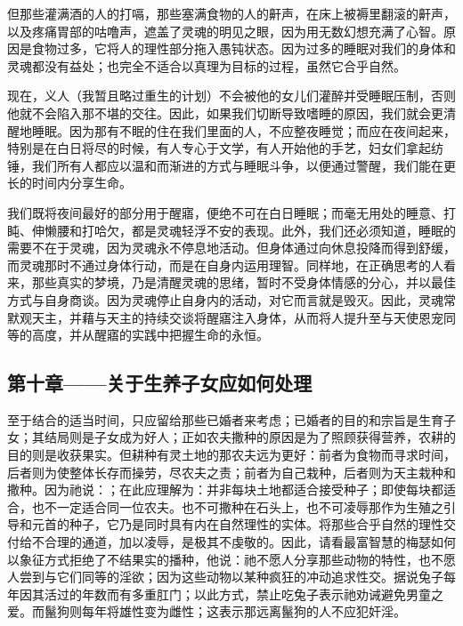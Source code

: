 但那些灌满酒的人的打嗝，那些塞满食物的人的鼾声，在床上被褥里翻滚的鼾声，以及疼痛胃部的咕噜声，遮盖了灵魂的明见之眼，因为用无数幻想充满了心智。原因是食物过多，它将人的理性部分拖入愚钝状态。因为过多的睡眠对我们的身体和灵魂都没有益处；也完全不适合以真理为目标的过程，虽然它合乎自然。\par

现在，义人（我暂且略过重生的计划）不会被他的女儿们灌醉并受睡眠压制，否则他就不会陷入那不堪的交往。因此，如果我们切断导致嗜睡的原因，我们就会更清醒地睡眠。因为那有不眠的住在我们里面的人，不应整夜睡觉；而应在夜间起来，特别是在白日将尽的时候，有人专心于文学，有人开始他的手艺，妇女们拿起纺锤，我们所有人都应以温和而渐进的方式与睡眠斗争，以便通过警醒，我们能在更长的时间内分享生命。\par

我们既将夜间最好的部分用于醒寤，便绝不可在白日睡眠；而毫无用处的睡意、打盹、伸懒腰和打哈欠，都是灵魂轻浮不安的表现。此外，我们还必须知道，睡眠的需要不在于灵魂，因为灵魂永不停息地活动。但身体通过向休息投降而得到舒缓，而灵魂那时不通过身体行动，而是在自身内运用理智。同样地，在正确思考的人看来，那些真实的梦境，乃是清醒灵魂的思绪，暂时不受身体情感的分心，并以最佳方式与自身商谈。因为灵魂停止自身内的活动，对它而言就是毁灭。因此，灵魂常默观天主，并藉与天主的持续交谈将醒寤注入身体，从而将人提升至与天使恩宠同等的高度，并从醒寤的实践中把握生命的永恒。\par


\subsection{第十章——关于生养子女应如何处理}

至于结合的适当时间，只应留给那些已婚者来考虑；已婚者的目的和宗旨是生育子女；其结局则是子女成为好人；正如农夫撒种的原因是为了照顾获得营养，农耕的目的则是收获果实。但耕种有灵土地的那农夫远为更好：前者为食物而寻求时间，后者则为使整体长存而操劳，尽农夫之责；前者为自己栽种，后者则为天主栽种和撒种。因为祂说：；在此应理解为：并非每块土地都适合接受种子；即使每块都适合，也不一定适合同一位农夫。也不可撒种在石头上，也不可凌辱那作为生殖之引导和元首的种子，它乃是同时具有内在自然理性的实体。将那些合乎自然的理性交付给不合理的通道，加以凌辱，是极其不虔敬的。因此，请看最富智慧的梅瑟如何以象征方式拒绝了不结果实的播种，他说：祂不愿人分享那些动物的特性，也不愿人尝到与它们同等的淫欲；因为这些动物以某种疯狂的冲动追求性交。据说兔子每年因其活过的年数而有多重肛门；以此方式，禁止吃兔子表示祂劝诫避免男童之爱。而鬣狗则每年将雄性变为雌性；这表示那远离鬣狗的人不应犯奸淫。\par

